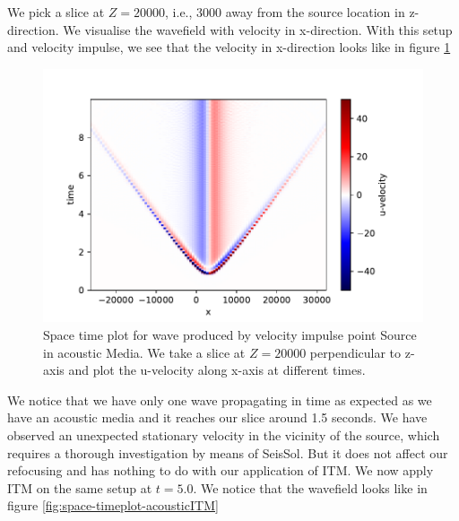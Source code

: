 We pick a slice at $Z=20000$, i.e., 3000 away from the source location in z-direction.
We visualise the wavefield with velocity in x-direction. With this setup and velocity impulse, we see that the velocity in x-direction
looks like in figure \ref{fig:space-timeplot-acousticnoITM}

\begin{figure}
    \centering
    \includegraphics[width=0.75\linewidth]{figures/Acoustic-noITM.pdf}
    \caption{Space time plot for wave produced by velocity impulse point Source in acoustic Media. We take a slice at $Z=20000$ perpendicular to z-axis 
    and plot the u-velocity along x-axis at different times.}
    \label{fig:space-timeplot-acousticnoITM}
\end{figure}

We notice that we have only one wave propagating in time as expected as we have an acoustic media and it reaches our slice around 1.5 seconds. 
We have observed an unexpected stationary velocity in the vicinity of the source, which requires a thorough investigation by means of SeisSol. But it does not affect our refocusing and has nothing to do with
our application of \ac{ITM}. We now apply ITM on the same setup at $t=5.0$. We notice that the wavefield looks like in figure \ref{fig:space-timeplot-acousticITM}

